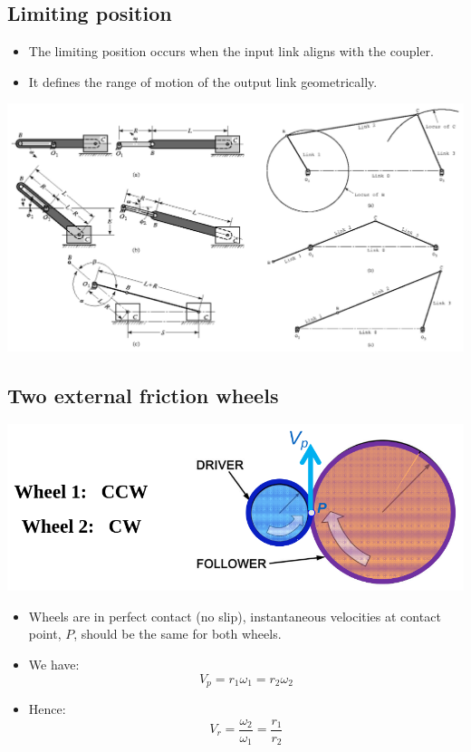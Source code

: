 \documentclass[11pt]{article}
\begin{document}
\subsection{Limiting position}
\label{sec:orgf1a2193}
\begin{itemize}
\item The limiting position occurs when the input link aligns with the coupler.
\item It defines the range of motion of the output link geometrically.
\end{itemize}

\begin{center}
\includegraphics[width=.9\linewidth]{./images/limiting-position-image.png}
\end{center}

 \newpage
\subsection{Two external friction wheels}
\label{sec:orga5f76f1}
\begin{center}
\includegraphics[width=.9\linewidth]{./images/two-external-friction-wheels.png}
\end{center}
\begin{itemize}
\item Wheels are in perfect contact (no slip), instantaneous velocities at contact point, \(P\), should be the same for both wheels.
\item We have:
\[V_p = r_1 \omega_1 = r_2 \omega_2\]
\item Hence:
\[V_r = \frac{\omega_2}{\omega_1} = \frac{r_1}{r_2} \tag{1}\]
\end{itemize}
\end{document}
